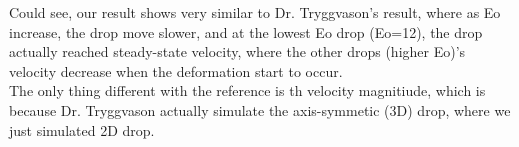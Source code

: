 \documentclass[12pt]{article}
\begin{document}
Could see, our result shows very similar to Dr. Tryggvason's result, where as Eo increase, the drop move slower, and at the lowest Eo drop (Eo=12), the drop actually reached steady-state velocity, where the other drops (higher Eo)'s velocity decrease when the deformation start to occur. \\

The only thing different with the reference is th velocity magnitiude, which is because Dr. Tryggvason actually simulate the axis-symmetic (3D) drop, where we just simulated 2D drop. 







\end{document}
